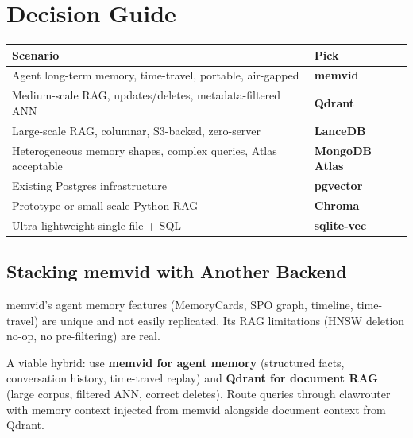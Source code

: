 \section{Decision Guide}

\begin{center}
\begin{tabular}{ll}
\toprule
\textbf{Scenario} & \textbf{Pick} \\
\midrule
Agent long-term memory, time-travel, portable, air-gapped & \textbf{memvid} \\
Medium-scale RAG, updates/deletes, metadata-filtered ANN & \textbf{Qdrant} \\
Large-scale RAG, columnar, S3-backed, zero-server & \textbf{LanceDB} \\
Heterogeneous memory shapes, complex queries, Atlas acceptable & \textbf{MongoDB Atlas} \\
Existing Postgres infrastructure & \textbf{pgvector} \\
Prototype or small-scale Python RAG & \textbf{Chroma} \\
Ultra-lightweight single-file + SQL & \textbf{sqlite-vec} \\
\bottomrule
\end{tabular}
\end{center}

\subsection{Stacking memvid with Another Backend}

memvid's agent memory features (MemoryCards, SPO graph, timeline, time-travel) are unique and
not easily replicated. Its RAG limitations (HNSW deletion no-op, no pre-filtering) are real.

A viable hybrid: use \textbf{memvid for agent memory} (structured facts, conversation
history, time-travel replay) and \textbf{Qdrant for document RAG} (large corpus, filtered
ANN, correct deletes). Route queries through clawrouter with memory context injected from
memvid alongside document context from Qdrant.
